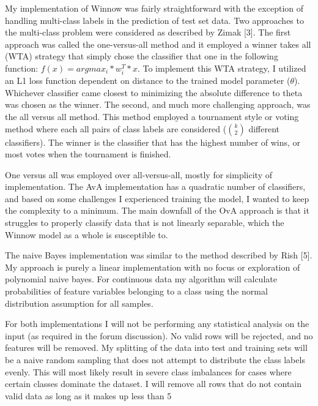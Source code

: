 \documentclass[11pt]{article}
\begin{document}
\par My implementation of Winnow was fairly straightforward with the exception of handling multi-class labels in the prediction of test set data. Two approaches to the multi-class problem were considered as described by Zimak [3]. The first approach was called the one-versus-all method and it employed a winner takes all (WTA) strategy that simply chose the classifier that one in the following function: $f(x) = argmax_i*w_i^T*x$. To implement this WTA strategy, I utilized an L1 loss function dependent on distance to the trained model parameter ($\theta$). Whichever classifier came closest to minimizing the absolute difference to theta was chosen as the winner. The second, and much more challenging approach, was the all versus all method. This method employed a tournament style or voting method where each all pairs of class labels are considered ($k \choose 2$ different classifiers). The winner is the classifier that has the highest number of wins, or most votes when the tournament is finished. 
\par One versus all was employed over all-versus-all, mostly for simplicity of implementation. The AvA implementation has a quadratic number of classifiers, and based on some challenges I experienced training the model, I wanted to keep the complexity to a minimum. The main downfall of the OvA approach is that it struggles to properly classify data that is not linearly separable, which the Winnow model as a whole is susceptible to.

\par The naive Bayes implementation was similar to the method described by Rish [5]. My approach is purely a linear implementation with no focus or exploration of polynomial naive bayes. For continuous data my algorithm will calculate probabilities of feature variables belonging to a class using the normal distribution assumption for all samples. 

\par For both implementations I will not be performing any statistical analysis on the input (as required in the forum discussion). No valid rows will be rejected, and no features will be removed. My splitting of the data into test and training sets will be a naive random sampling that does not attempt to distribute the class labels evenly. This will most likely result in severe class imbalances for cases where certain classes dominate the dataset. I will remove all rows that do not contain valid data as long as it makes up less than 5%
\end{document}
